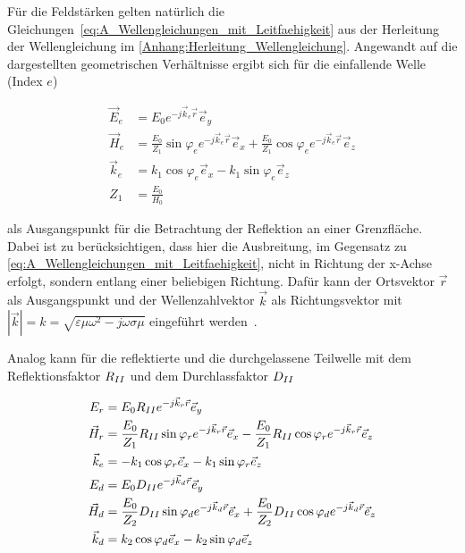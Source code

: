 Für die Feldstärken gelten natürlich die Gleichungen~\eqref{eq:A_Wellengleichungen_mit_Leitfaehigkeit} aus der Herleitung der Wellengleichung im \Anhang \ref{Anhang:Herleitung_Wellengleichung}. Angewandt auf die dargestellten geometrischen Verhältnisse ergibt sich für die einfallende Welle (Index \glqq$e$\grqq)~\cite{EM_Schirmung}

\begin{align}
    \vec E_e &= E_0 e^{-j\vec k_e \vec r} \vec e_y \\
    \vec H_e &= \frac{E_0}{Z_1} \sin{\varphi_e} e^{-j \vec k_e \vec r} \vec e_x + \frac{E_0}{Z_1} \cos{\varphi_e} e^{-j \vec k_e \vec r} \vec e_z \\
    \vec k_e &= k_1 \cos{\varphi_e} \vec e_x - k_1 \sin{\varphi_e} \vec e_z \\
    Z_1 &= \frac{E_0}{H_0}
\end{align}

als Ausgangspunkt für die Betrachtung der Reflektion an einer Grenzfläche. Dabei ist zu berücksichtigen, dass hier die Ausbreitung, im Gegensatz zu \Gleichungen \eqref{eq:A_Wellengleichungen_mit_Leitfaehigkeit}, nicht in Richtung der x-Achse erfolgt, sondern entlang einer beliebigen Richtung. Dafür kann der Ortsvektor $\vec r$ als Ausgangspunkt und der Wellenzahlvektor $\vec k$ als Richtungsvektor mit
$|\vec k| = k = \sqrt{\varepsilon \mu \omega^2 - j \omega \sigma \mu} $ eingeführt werden~\cite{EM_Schirmung}. \par \vspace{\linespace} Analog kann für die reflektierte und die durchgelassene Teilwelle mit dem Reflektionsfaktor $R_{\uproman{2}}$ und dem Durchlassfaktor $D_{\uproman{2}}$

\begin{align}
    E_r &= E_0 R_{\uproman{2}} e^{-j\vec k_r \vec r} \vec e_y \\
    \vec H_r &= \frac{E_0}{Z_1} R_{\uproman{2}} \sin{\varphi_r} e^{-j \vec k_r \vec r} \vec e_x - \frac{E_0}{Z_1} R_{\uproman{2}} \cos{\varphi_r} e^{-j \vec k_r \vec r} \vec e_z \\
    \vec k_e &= - k_1 \cos{\varphi_r} \vec e_x - k_1 \sin{\varphi_r} \vec e_z \\
    E_d &= E_0 D_{\uproman{2}} e^{-j\vec k_d \vec r} \vec e_y \\
    \vec H_d &= \frac{E_0}{Z_2} D_{\uproman{2}} \sin{\varphi_d} e^{-j \vec k_d \vec r} \vec e_x + \frac{E_0}{Z_2} D_{\uproman{2}} \cos{\varphi_d} e^{-j \vec k_d \vec r} \vec e_z \\
    \vec k_d &= k_2 \cos{\varphi_d} \vec e_x - k_2 \sin{\varphi_d} \vec e_z
\end{align}

